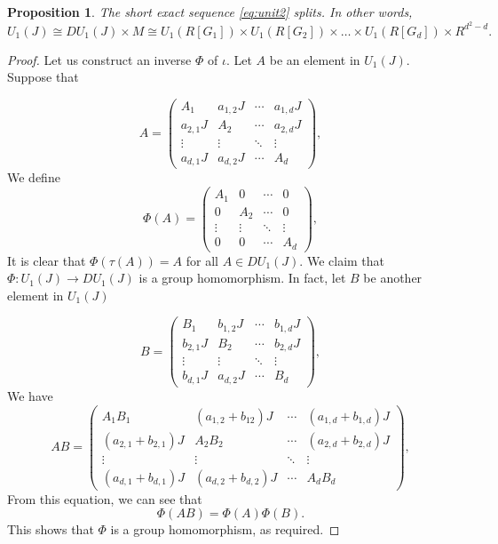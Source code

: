 \documentclass[12pt, a4paper]{amsart}
\numberwithin{equation}{section} %
\theoremstyle{plain}
\theoremstyle{definition}
\theoremstyle{plain}
\newtheorem{prop}[thm]{Proposition}
\theoremstyle{remark}
\newcommand{\ones}{J}
\begin{document}
\begin{prop}  \label{prop:principal_unit_decomposition} 
The short exact sequence \ref{eq:unit2} splits. In other words, 
\[ U_1(J) \cong DU_1(J) \times M \cong U_1(R[G_1]) \times U_1(R[G_2]) \times \ldots \times U_1(R[G_d]) \times R^{d^2-d}.\]
\end{prop}
\begin{proof}
Let us construct an inverse $\Phi$ of $\iota.$ Let $A$ be an element in $U_1(J)$. Suppose that 

\begin{equation*}
A=\left(\begin{array}{c|c|c|c}
A_1 & a_{1,2}\ones & \cdots & a_{1,d}\ones \\
\hline
a_{2,1}\ones & A_2 & \cdots & a_{2,d}\ones \\
\hline
\vdots & \vdots & \ddots & \vdots \\
\hline
a_{d,1}\ones & a_{d,2}\ones & \cdots & A_d
\end{array}\right),
\end{equation*}
We define 
\begin{equation*}
\Phi(A)=\left(\begin{array}{c|c|c|c}
A_1 & 0 & \cdots & 0 \\
\hline
0 & A_2 & \cdots & 0 \\
\hline
\vdots & \vdots & \ddots & \vdots \\
\hline
0 & 0 & \cdots & A_d
\end{array}\right),
\end{equation*}
It is clear that $\Phi(\tau(A))=A$ for all $A \in DU_1(J).$ We claim that $\Phi: U_1(J) \to DU_1(J)$ is a group homomorphism. In fact, let $B$ be another element in $U_1(J)$ 

\begin{equation*}
B=\left(\begin{array}{c|c|c|c}
B_1 & b_{1,2}\ones & \cdots & b_{1,d}\ones \\
\hline
b_{2,1}\ones & B_2 & \cdots & b_{2,d}\ones \\
\hline
\vdots & \vdots & \ddots & \vdots \\
\hline
b_{d,1}\ones & a_{d,2}\ones & \cdots & B_d
\end{array}\right),
\end{equation*}
We have 
\begin{equation*}
AB=\left(\begin{array}{c|c|c|c}
A_1B_1 & (a_{1,2}+b_{12})\ones & \cdots & (a_{1,d}+b_{1,d})\ones \\
\hline
(a_{2,1}+b_{2,1})\ones & A_2B_2 & \cdots & (a_{2,d}+b_{2,d}) \ones \\
\hline
\vdots & \vdots & \ddots & \vdots \\
\hline
(a_{d,1}+b_{d,1}) \ones & (a_{d,2}+b_{d,2})\ones & \cdots & A_d B_d
\end{array}\right),
\end{equation*}
From this equation, we can see that 
\[ \Phi(AB)= \Phi(A) \Phi(B) . \]
This shows that $\Phi$ is a group homomorphism, as required. 


\end{proof}
\end{document}
